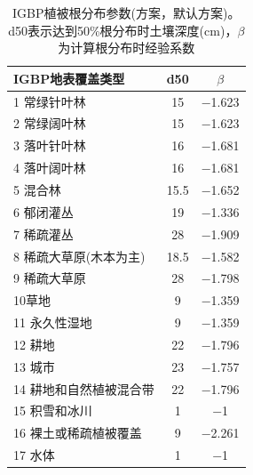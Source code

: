 \begin{table}[htbp]
    \centering
    \caption[IGBP植被根分布参数(\citet{schenk2002rooting}方案)]{IGBP植被根分布参数(\citet{schenk2002rooting}方案，默认方案)。d50表示达到50\%根分布时土壤深度(cm)，$\beta$为计算根分布时经验系数}
    \label{tab:IGBPSchenkANDJackson2002方案默认方案}
    \begin{tabular}{@{}lcc@{}}
    \toprule
    IGBP地表覆盖类型     & d50  & $\beta$ \\ \midrule
    1 常绿针叶林       & 15   & \num{ -1.623 } \\  
    2 常绿阔叶林       & 15   & \num{ -1.623 } \\
    3 落叶针叶林       & 16   & \num{ -1.681 } \\
    4 落叶阔叶林       & 16   & \num{ -1.681 } \\
    5 混合林         & 15.5 & \num{ -1.652 } \\
    6 郁闭灌丛        & 19   & \num{ -1.336 } \\
    7 稀疏灌丛        & 28   & \num{ -1.909 } \\
    8 稀疏大草原(木本为主) & 18.5 & \num{ -1.582 } \\
    9 稀疏大草原       & 28   & \num{ -1.798 } \\
    10草地          & 9    & \num{ -1.359 } \\
    11 永久性湿地      & 9    & \num{ -1.359 } \\
    12 耕地         & 22   & \num{ -1.796 } \\
    13 城市         & 23   & \num{ -1.757 } \\
    14 耕地和自然植被混合带 & 22   & \num{ -1.796 } \\
    15 积雪和冰川      & 1    & \num{ -1     } \\
    16 裸土或稀疏植被覆盖  & 9    & \num{ -2.261 } \\
    17 水体           & 1    & \num {-1   }   \\ \bottomrule
\end{tabular}
\end{table}


